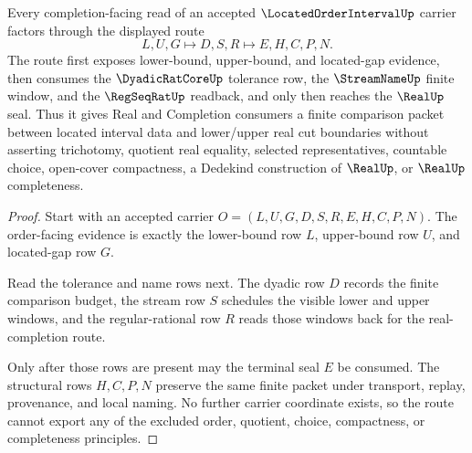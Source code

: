 \begin{theorem}
\label{thm:located-order-interval-real-completion-route}
Every completion-facing read of an accepted $\LocatedOrderIntervalUp$ carrier factors through the displayed route
$$
L,U,G \longmapsto D,S,R \longmapsto E,H,C,P,N .
$$
The route first exposes lower-bound, upper-bound, and located-gap evidence, then consumes the $\DyadicRatCoreUp$ tolerance row, the $\StreamNameUp$ finite window, and the $\RegSeqRatUp$ readback, and only then reaches the $\RealUp$ seal. Thus it gives Real and Completion consumers a finite comparison packet between located interval data and lower/upper real cut boundaries without asserting trichotomy, quotient real equality, selected representatives, countable choice, open-cover compactness, a Dedekind construction of $\RealUp$, or $\RealUp$ completeness.
\end{theorem}
\begin{proof}
Start with an accepted carrier $O=(L,U,G,D,S,R,E,H,C,P,N)$. The order-facing evidence is exactly the lower-bound row $L$, upper-bound row $U$, and located-gap row $G$.

Read the tolerance and name rows next. The dyadic row $D$ records the finite comparison budget, the stream row $S$ schedules the visible lower and upper windows, and the regular-rational row $R$ reads those windows back for the real-completion route.

Only after those rows are present may the terminal seal $E$ be consumed. The structural rows $H,C,P,N$ preserve the same finite packet under transport, replay, provenance, and local naming. No further carrier coordinate exists, so the route cannot export any of the excluded order, quotient, choice, compactness, or completeness principles.
\end{proof}



